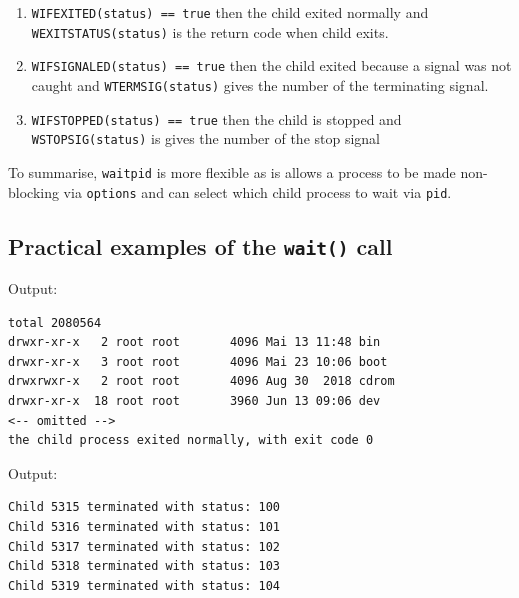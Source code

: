 \documentclass[a4paper]{article}
\begin{document}
\begin{enumerate}
    \item \texttt{WIFEXITED(status) == true} then the child exited normally
and \texttt{WEXITSTATUS(status)} is the return code when child exits.
    \item \texttt{WIFSIGNALED(status) == true} then the child exited because a signal was not caught and 
\texttt{WTERMSIG(status)} gives the number of the terminating signal.
    \item \texttt{WIFSTOPPED(status) == true} then the child is stopped and 
\texttt{WSTOPSIG(status)} is gives the number of the stop signal
\end{enumerate}

To summarise, \texttt{waitpid} is more flexible as is allows a process to be made non-blocking via \texttt{options} and can select which child process to wait via \texttt{pid}.




\subsection{Practical examples of the \texttt{wait()} call}




\begin{exmp}
\textup{

}
\end{exmp}
Output:
\begin{verbatim}
total 2080564
drwxr-xr-x   2 root root       4096 Mai 13 11:48 bin
drwxr-xr-x   3 root root       4096 Mai 23 10:06 boot
drwxrwxr-x   2 root root       4096 Aug 30  2018 cdrom
drwxr-xr-x  18 root root       3960 Jun 13 09:06 dev
<-- omitted -->
the child process exited normally, with exit code 0
\end{verbatim}


\begin{exmp}
\textup{

}
\end{exmp}
Output:
\begin{verbatim}
Child 5315 terminated with status: 100
Child 5316 terminated with status: 101
Child 5317 terminated with status: 102
Child 5318 terminated with status: 103
Child 5319 terminated with status: 104
\end{verbatim}
\end{document}
